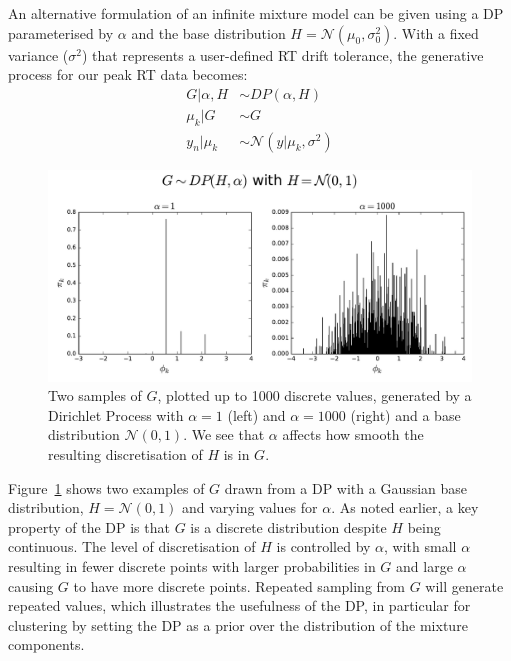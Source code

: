 An alternative formulation of an infinite mixture model can be given using a DP parameterised by $\alpha$ and the base distribution $H=\mathcal{N}(\mu_0, \sigma_0^2)$. With a fixed variance ($\sigma^2$) that represents a user-defined RT drift tolerance, the generative process for our peak RT data becomes:
\begin{equation}
\begin{aligned}
G \vert \alpha, H  &\sim DP(\alpha, H) \\
\mu_k \vert G     &\sim G \\
y_n \vert \mu_k  &\sim \mathcal{N}(y \vert \mu_k, \sigma^2)
\end{aligned}
\label{eq:background-infinite-mixture-dp}
\end{equation}

\begin{figure}
\noindent \begin{centering}
\includegraphics[width=1.0\textwidth]{03-machine-learning/figures/dp_samples_stick.pdf}
\par\end{centering}
\caption[Two samples of $G$, plotted up to 1000 discrete values, generated by a Dirichlet Process.]{\label{fig:g-from-dp-stick}Two samples of $G$, plotted up to 1000 discrete values, generated by a Dirichlet Process with $\alpha=1$ (left) and $\alpha=1000$ (right) and a base distribution $\mathcal{N}(0, 1)$. We see that $\alpha$ affects how smooth the resulting discretisation of $H$ is in $G$.}
\end{figure}

Figure~\ref{fig:g-from-dp-stick} shows two examples of $G$ drawn from a DP with a Gaussian base distribution, $H=\mathcal{N}(0, 1)$ and varying values for $\alpha$. As noted earlier, a key property of the DP is that $G$ is a discrete distribution despite $H$ being continuous. The level of discretisation of $H$ is controlled by $\alpha$, with small $\alpha$ resulting in fewer discrete points with larger probabilities in $G$ and large $\alpha$ causing $G$ to have more discrete points. Repeated sampling from $G$ will generate repeated values, which illustrates the usefulness of the DP, in particular for clustering by setting the DP as a prior over the distribution of the mixture components. 

